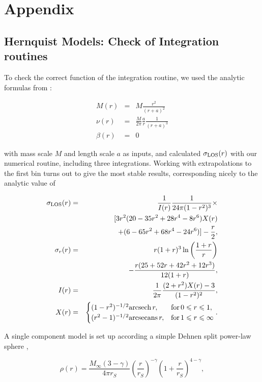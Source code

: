 \section{Appendix}

\subsection{Hernquist Models: Check of Integration routines}
To check the correct function of the integration routine, we used the
analytic formulas from \cite{Hernquist1990}:

\begin{eqnarray}
M(r) &=& M\frac{r^2}{(r+a)^2}\\
\nu(r) &=& \frac{M}{2\pi}\frac{a}{r}\frac{1}{(r+a)^3}\\
\beta(r) &=& 0
\end{eqnarray}

with mass scale $M$ and length scale $a$ as inputs, and calculated
$\sigma_{\text{LOS}}(r)$ with our numerical routine, including three
integrations. Working with extrapolations to the first bin turns out
to give the most stable results, corresponding nicely to the analytic
value  of

\begin{eqnarray*}
\sigma_{\text{LOS}}(r) &=& \frac{1}{I(r)}\frac{1}{24\pi(1-r^2)^3}\times\\
           && \qquad [3r^2(20-35r^2+28r^4-8r^6)X(r) \\
           && \qquad + (6-65r^2+68r^4-24r^6)]-\frac{r}{2},\\
\sigma_r(r) &=& r(1+r)^3 \ln\left(\frac{1+r}{r}\right)\\
 &&\qquad-\frac{r(25+52r+42r^2+12r^3)}{12(1+r)},\\
I(r) &=& \frac{1}{2\pi}\frac{(2+r^2)X(r)-3}{(1-r^2)^2},\\
X(r) &=& \begin{cases}(1-r^2)^{-1/2} \text{arcsech}\,r,& \text{for}\,0\leqslant r\leqslant 1,\\
                (r^2-1)^{-1/2} \text{arcsecans}\,r,& \text{for}\,1\leqslant r\leqslant\infty
                \end{cases}.
\end{eqnarray*}



A single component model is set up according a simple Dehnen split
power-law sphere \cite{Read+2006},

\begin{equation}
  \rho(r) = \frac{M_\infty(3-\gamma)}{4\pi r_S}\left(\frac{r}{r_S}\right)^{-\gamma}\left(1+\frac{r}{r_S}\right)^{4-\gamma},
\end{equation}

